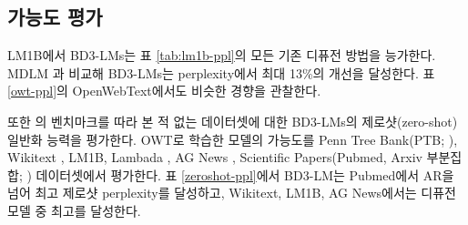 \documentclass{article} %
\def\algos{BD3-LMs}
\def\algo{BD3-LM}
\def\owt{OWT}
\begin{document}
\subsection{가능도 평가}
LM1B에서 \algos{}는 표 \ref{tab:lm1b-ppl}의 모든 기존 디퓨전 방법을 능가한다. MDLM \citep{sahoo2024simple}과 비교해 \algos{}는 perplexity에서 최대 13\%의 개선을 달성한다. 표 \ref{owt-ppl}의 OpenWebText에서도 비슷한 경향을 관찰한다.


또한 \citet{radford2019language}의 벤치마크를 따라 본 적 없는 데이터셋에 대한 \algos{}의 제로샷(zero-shot) 일반화 능력을 평가한다. OWT로 학습한 모델의 가능도를 Penn Tree Bank(PTB; \citep{marcus1993building}), Wikitext \citep{merity2016pointer}, LM1B, Lambada \citep{paperno-EtAl:2016:P16-1}, AG News \citep{Zhang2015CharacterlevelCN}, Scientific Papers(Pubmed, Arxiv 부분집합; \citep{Cohan_2018}) 데이터셋에서 평가한다. 표 \ref{zeroshot-ppl}에서 \algo{}는 Pubmed에서 AR을 넘어 최고 제로샷 perplexity를 달성하고, Wikitext, LM1B, AG News에서는 디퓨전 모델 중 최고를 달성한다.

\end{document}
